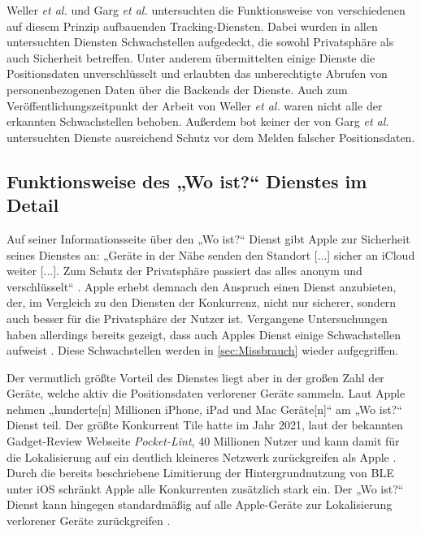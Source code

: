 Weller \textit{et al.} \cite{Weller_BLE_Finders} und Garg \textit{et al.} \cite{Garg_Secure_Tracker} untersuchten die Funktionsweise von verschiedenen auf diesem Prinzip aufbauenden Tracking-Diensten.
Dabei wurden in allen untersuchten Diensten Schwachstellen aufgedeckt, die sowohl Privatsphäre als auch Sicherheit betreffen.
Unter anderem übermittelten einige Dienste die Positionsdaten unverschlüsselt und erlaubten das unberechtigte Abrufen von personenbezogenen Daten über die Backends der Dienste.
Auch zum Veröffentlichungszeitpunkt der Arbeit von Weller \textit{et al.} \cite{Weller_BLE_Finders} waren nicht alle der erkannten Schwachstellen behoben.
Außerdem bot keiner der von Garg \textit{et al.} \cite{Garg_Secure_Tracker} untersuchten Dienste ausreichend Schutz vor dem Melden falscher Positionsdaten.


\subsection{Funktionsweise des „Wo ist?“ Dienstes im Detail}
\label{sec:Funktionsweise_FindMy}
Auf seiner Informationsseite über den „Wo ist?“ Dienst gibt Apple zur Sicherheit seines Dienstes an: „Geräte in der Nähe senden den Standort [...] sicher an iCloud weiter [...]. Zum Schutz der Privatsphäre passiert das alles anonym und verschlüsselt“ \cite{Apple_WoIst}.
Apple erhebt demnach den Anspruch einen Dienst anzubieten, der, im Vergleich zu den Diensten der Konkurrenz, nicht nur sicherer, sondern auch besser für die Privatsphäre der Nutzer ist.
Vergangene Untersuchungen haben allerdings bereits gezeigt, dass auch Apples Dienst einige Schwachstellen aufweist \cite{Heinrich_FindMy,Tonetto_FindMy}.
Diese Schwachstellen werden in \autoref{sec:Missbrauch} wieder aufgegriffen.

Der vermutlich größte Vorteil des Dienstes liegt aber in der großen Zahl der Geräte, welche aktiv die Positionsdaten verlorener Geräte sammeln.
Laut Apple nehmen „hunderte[n] Millionen iPhone, iPad und Mac Geräte[n]“ \cite{Apple_WoIst} am „Wo ist?“ Dienst teil.
Der größte Konkurrent Tile hatte im Jahr 2021, laut der bekannten Gadget-Review Webseite \textit{Pocket-Lint}, 40 Millionen Nutzer und kann damit für die Lokalisierung auf ein deutlich kleineres Netzwerk zurückgreifen als Apple \cite{Tile_Network}.
Durch die bereits beschriebene Limitierung der Hintergrundnutzung von \ac{BLE} unter iOS schränkt Apple alle Konkurrenten zusätzlich stark ein.
Der „Wo ist?“ Dienst kann hingegen standardmäßig auf alle Apple-Geräte zur Lokalisierung verlorener Geräte zurückgreifen \cite{Heinrich_AirGuard}.

